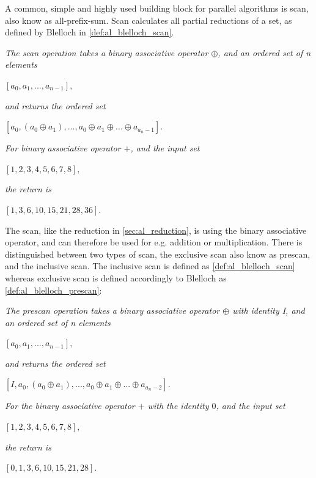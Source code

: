 A common, simple and highly used building block for parallel algorithms is scan, also know as all-prefix-sum. Scan calculates all partial reductions of a set, as defined by Blelloch \cite{BlellochTR90} in \cref{def:al_blelloch_scan}.

\begin{definition}
\label{def:al_blelloch_scan}
\textit{The scan operation takes a binary associative operator $\oplus$, and an ordered set of n elements}
\begin{center}
$[a_0,a_1,...,a_{n-1}],$
\end{center}
\textit{and returns the ordered set}
\begin{center}
$[a_0, (a_0 \oplus a_1),...,{a_0 \oplus a_1 \oplus ... \oplus a_{a_n-1}}].$
\end{center}
\end{definition} 
\begin{example}
\textit{For binary associative operator $+$, and the input set}
\begin{center}
	$[1,2,3,4,5,6,7,8],$
\end{center}
\textit{the return is}
\begin{center}
	$[1,3,6,10,15,21,28,36].$
\end{center}
\end{example}

The scan, like the reduction in \cref{sec:al_reduction}, is using the binary associative operator, and can therefore be used for e.g. addition or multiplication. There is distinguished between two types of scan, the exclusive scan also know as prescan, and the inclusive scan. The inclusive scan is defined as \cref{def:al_blelloch_scan} whereas exclusive scan is defined accordingly to Blelloch \cite{BlellochTR90} as \cref{def:al_blelloch_prescan}:

\begin{definition}
	\label{def:al_blelloch_prescan}
	\textit{The prescan operation takes a binary associative operator $\oplus$ with identity I, and an ordered set of n elements}
	\begin{center}
		$[a_0,a_1,...,a_{n-1}],$
	\end{center}
	\textit{and returns the ordered set}
	\begin{center}
		$[I,a_0, (a_0 \oplus a_1),...,{a_0 \oplus a_1 \oplus ... \oplus a_{a_n-2}}].$
	\end{center}
\end{definition}
\begin{example}
	\textit{For the binary associative operator $+$ with the identity $0$, and the input set}
	\begin{center}
		$[1,2,3,4,5,6,7,8],$
	\end{center}
	\textit{the return is}
	\begin{center}
		$[0,1,3,6,10,15,21,28].$
	\end{center}
\end{example}

